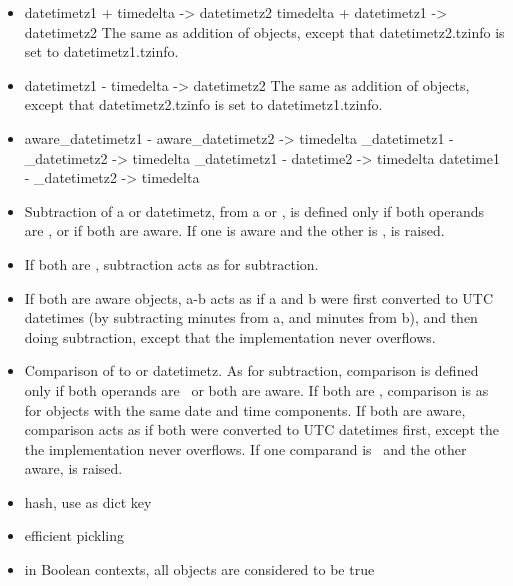 \begin{itemize}
  \item
    datetimetz1 + timedelta -> datetimetz2
    timedelta + datetimetz1 -> datetimetz2
    The same as addition of  objects, except that
    datetimetz2.tzinfo is set to datetimetz1.tzinfo.

  \item
    datetimetz1 - timedelta -> datetimetz2
    The same as addition of  objects, except that
    datetimetz2.tzinfo is set to datetimetz1.tzinfo.

  \item
    aware_datetimetz1 - aware_datetimetz2 -> timedelta
    \naive\_datetimetz1 - \naive\_datetimetz2 -> timedelta
    \naive\_datetimetz1 - datetime2 -> timedelta
    datetime1 - \naive\_datetimetz2 -> timedelta

  \item
    Subtraction of a  or datetimetz, from a
     or , is defined only if both
    operands are \naive, or if both are aware.  If one is aware and
    the other is \naive,  is raised.

  \item
    If both are \naive, subtraction acts as for 
    subtraction.

  \item
    If both are aware  objects, a-b acts as if a and b were
    first converted to UTC datetimes (by subtracting 
    minutes from a, and  minutes from b), and then doing
     subtraction, except that the implementation never
    overflows.

  \item
    Comparison of  to  or datetimetz.  As for
    subtraction, comparison is defined only if both operands are
    \naive\ or both are aware.  If both are \naive, comparison is as
    for  objects with the same date and time components.
    If both are aware, comparison acts as if both were converted to
    UTC datetimes first, except the the implementation never
    overflows.  If one comparand is \naive\ and the other aware,
     is raised.

  \item
    hash, use as dict key

  \item
    efficient pickling

  \item
    in Boolean contexts, all  objects are considered to be
    true
\end{itemize}

